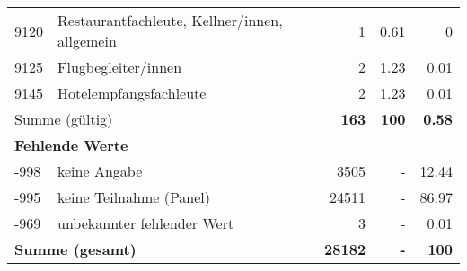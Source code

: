 \begin{longtable}{lXrrr}
        9120 & \multicolumn{1}{X}{Restaurantfachleute, Kellner/innen, allgemein} & %
          \num{1} &
          \num[round-mode=places,round-precision=2]{0.61} &
          \num[round-mode=places,round-precision=2]{0} \\

        9125 & \multicolumn{1}{X}{Flugbegleiter/innen} & %
          \num{2} &
          \num[round-mode=places,round-precision=2]{1.23} &
          \num[round-mode=places,round-precision=2]{0.01} \\

        9145 & \multicolumn{1}{X}{Hotelempfangsfachleute} & %
          \num{2} &
          \num[round-mode=places,round-precision=2]{1.23} &
          \num[round-mode=places,round-precision=2]{0.01} \\

     \midrule
     \multicolumn{2}{l}{Summe (gültig)} &
       \textbf{\num{163}} &
     \textbf{100} &
       \textbf{\num[round-mode=places,round-precision=2]{0.58}} \\
     \multicolumn{5}{l}{\textbf{Fehlende Werte}}\\
       -998 &
       keine Angabe &
         \num{3505} &
        - &
         \num[round-mode=places,round-precision=2]{12.44} \\
       -995 &
       keine Teilnahme (Panel) &
         \num{24511} &
        - &
         \num[round-mode=places,round-precision=2]{86.97} \\
       -969 &
       unbekannter fehlender Wert &
         \num{3} &
        - &
         \num[round-mode=places,round-precision=2]{0.01} \\
     \midrule
     \multicolumn{2}{l}{\textbf{Summe (gesamt)}} &
          \textbf{\num{28182}} &
        \textbf{-} &
        \textbf{100} \\
     \bottomrule
     \end{longtable}
     
